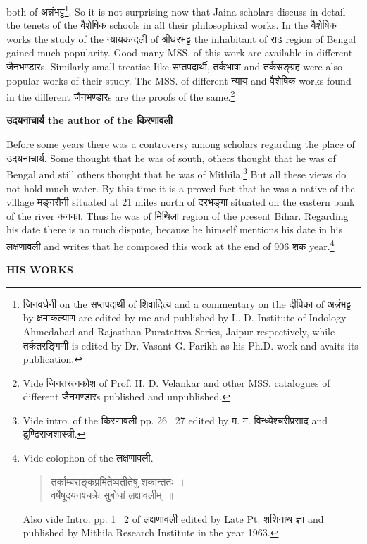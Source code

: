 \documentclass[11pt, openany]{book}
\begin{document}
\newpage
\noindent
both of अन्नंभट्ट\renewcommand{\thefootnote}{1}\footnote{जिनवर्धनी on the सप्तपदार्थी of शिवादित्य and a commentary on the दीपिका of अन्नंभट्ट by क्षमाकल्याण are edited by me and published by L. D. Institute of Indology Ahmedabad and Rajasthan Puratattva Series, Jaipur respectively, while तर्कतरङ्गिणी is edited by Dr. Vasant G. Parikh as his Ph.D. work and avaits its publication.}. So it is not surprising now that Jaina scholars discuss in detail the tenets of the वैशेषिक schools in all their philosophical works. In the वैशेषिक works the study of the न्यायकन्दली of श्रीधरभट्ट the inhabitant of राढ region of Bengal gained much popularity. Good many MSS. of this work are available in different जैनभण्डारs. Similarly small treatise Iike सप्तपदार्थी, तर्कभाषा and तर्कसङ्ग्रह were also popular works of their study. The MSS. of different न्याय and वैशेषिक works found in the different जैनभण्डारs are the proofs of the same.\renewcommand{\thefootnote}{2}\footnote{Vide जिनतरत्नकोश of Prof. H. D. Velankar and other MSS. catalogues of different जैनभण्डारs published and unpublished.}

\noindent
\textbf{उदयनाचार्य the author of the किरणावली}

Before some years there was a controversy among scholars regarding the place of उदयनाचार्य. Some thought that he was of south, others thought that he was of Bengal and still others thought that he was of Mithila.\renewcommand{\thefootnote}{3}\footnote{Vide intro. of the किरणावली pp. 26 \textendash\ 27 edited by म. म. विन्ध्येश्चरीप्रसाद and ढुण्ढिराजशास्त्री.} But all these views do not hold much water. By this time it is a proved fact that he was a native of the village मङ्गरौनी situated at 21 miles north of दरभङ्गा situated on the eastern bank of the river कनका. Thus he was of मिथिला region of the present Bihar. Regarding his date there is no much dispute, because he himself mentions his date in his लक्षणावली and writes that he composed this work at the end of 906 शक year.\renewcommand{\thefootnote}{4}\footnote{Vide colophon of the लक्षणावली.
\begin{quote}
{\qt तर्काम्बराङ्कप्रमितेष्वतीतेषु शकान्ततः~।\\
वर्षेषूदयनश्चक्रे सुबोधां लक्षावलीम्~॥}
\end{quote}
Also vide Intro. pp. 1 \textendash\ 2 of लक्षणावली edited by Late Pt. शशिनाथ ज्ञा and published by Mithila Research Institute in the year 1963.}

\newpage
\begin{center}
\textbf{\large HIS WORKS}
\end{center}
\end{document}
